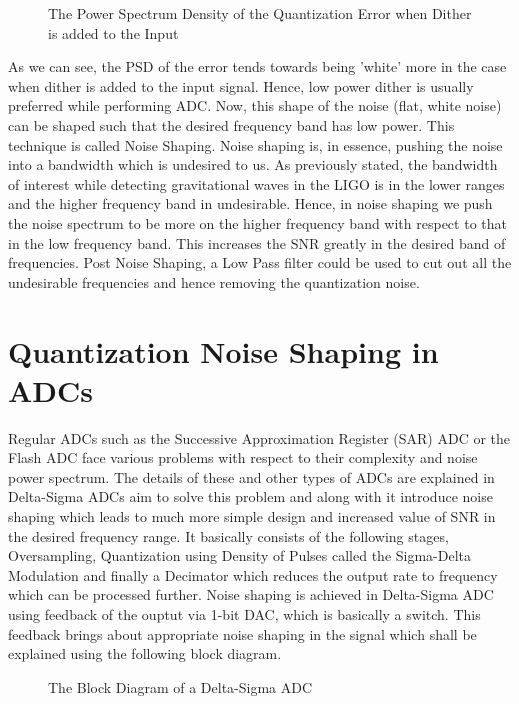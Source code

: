 \documentclass[colorlinks=true,pdfstartview=FitV,linkcolor=blue,
            citecolor=red,urlcolor=magenta]{ligodoc}
\begin{document}
 \begin{figure}[htbp]
 
  \centering
  
  \caption{The Power Spectrum Density of the Quantization Error when Dither is added to the Input}
 	
\end{figure}

As we can see, the PSD of the error tends towards being 'white' more in the case when dither is added to the input signal. 
Hence, low power dither is usually preferred while performing ADC. 
Now, this shape of the noise (flat, white noise) can be shaped such that the desired frequency band has low power. This technique is called Noise Shaping. 
 Noise shaping is, in essence, pushing the noise into a bandwidth which is undesired to us. As previously stated, the bandwidth of interest while detecting gravitational waves in the LIGO is in the lower ranges and the higher frequency band in undesirable. Hence, in noise shaping we push the noise spectrum to be more on the higher frequency band with respect to that in the low frequency band. This increases the SNR greatly in the desired band of frequencies.  Post Noise Shaping, a Low Pass filter could be used to cut out all the undesirable frequencies and hence removing the quantization noise.
 
 \section{Quantization Noise Shaping in ADCs}
 Regular ADCs such as the Successive Approximation Register (SAR) ADC or the Flash ADC face various problems with respect to their complexity and noise power spectrum. The details of these and other types of ADCs are explained in \cite{Oppenheim} 
 Delta-Sigma ADCs aim to solve this problem and along with it introduce noise shaping which leads to much more simple design and increased value of SNR in the desired frequency range. It basically consists of the following stages, Oversampling, Quantization using Density of Pulses called the Sigma-Delta Modulation and finally a Decimator which reduces the output rate to frequency which can be processed further. 
 Noise shaping is achieved in Delta-Sigma ADC using feedback of the ouptut via 1-bit DAC, which is basically a switch. This feedback brings about appropriate noise shaping in the signal which shall be explained using the following block diagram.
 
 \begin{figure}[htbp]
 
  \centering
  
  \caption{The Block Diagram of a Delta-Sigma ADC}
 
\end{figure}
\end{document}
